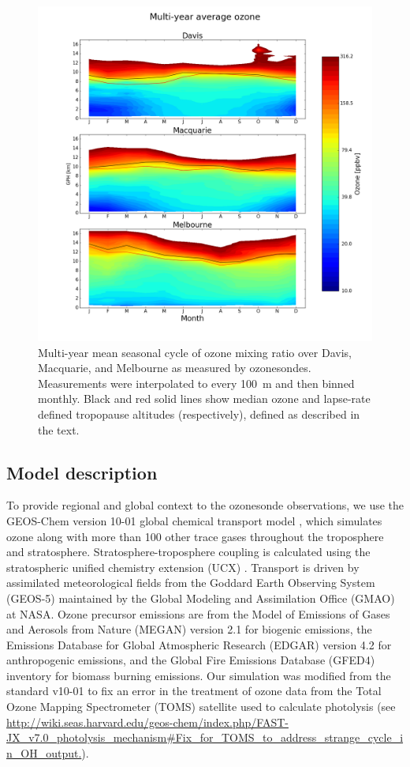 \documentclass[acp, manuscript]{copernicus} %
\begin{document}
    \begin{figure}[t]
      \includegraphics[width=12.0cm]{figures/seasonaltropozone}
      \caption{ %
	Multi-year mean seasonal cycle of ozone mixing ratio over Davis, Macquarie, and Melbourne as measured by ozonesondes.
	Measurements were interpolated to every 100~m and then binned monthly.
	Black and red solid lines show median ozone and lapse-rate defined tropopause altitudes (respectively), defined as described in the text. }
      \label{fig:seasonaltropozone}
    \end{figure}

  \subsection{Model description}
    \label{Section:GEOSChemDescription}
    To provide regional and global context to the ozonesonde observations, we use the GEOS-Chem version 10-01 global chemical transport model \citep{Bey2001}, which simulates ozone along with more than 100 other trace gases throughout the troposphere and stratosphere. 
    Stratosphere-troposphere coupling is calculated using the stratospheric unified chemistry extension (UCX) \citep{Eastham2014}.
    Transport is driven by assimilated meteorological fields from the Goddard Earth Observing System (GEOS-5) maintained by the Global Modeling and Assimilation Office (GMAO) at NASA.
    Ozone precursor emissions are from the Model of Emissions of Gases and Aerosols from Nature (MEGAN) version 2.1 \citep{Guenther2012} for biogenic emissions, the Emissions Database for Global Atmospheric Research (EDGAR) version 4.2 for anthropogenic emissions, and the Global Fire Emissions Database (GFED4) inventory \citep{Giglio2013} for biomass burning emissions. 
    Our simulation was modified from the standard v10-01 to fix an error in the treatment of ozone data from the Total Ozone Mapping Spectrometer (TOMS) satellite used to calculate photolysis (see \url{http://wiki.seas.harvard.edu/geos-chem/index.php/FAST-JX_v7.0_photolysis_mechanism#Fix_for_TOMS_to_address_strange_cycle_in_OH_output.}).  
\end{document}
